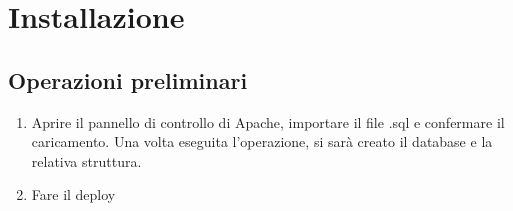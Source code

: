 \section{Installazione}
\subsection{Operazioni preliminari}
\begin{enumerate}
\item Aprire il pannello di controllo di Apache, importare il file .sql e confermare il caricamento. Una volta eseguita l'operazione, si sarà creato il database e la relativa struttura.
\item Fare il deploy
\end{enumerate}


